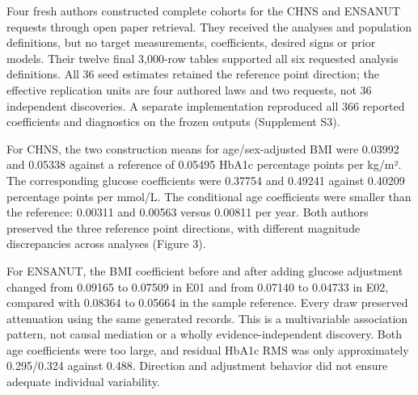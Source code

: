 \documentclass[11pt,letterpaper]{article}
\begin{document}
Four fresh authors constructed complete cohorts for the CHNS and ENSANUT requests through open paper retrieval. They received the analyses and population definitions, but no target measurements, coefficients, desired signs or prior models. Their twelve final 3,000-row tables supported all six requested analysis definitions. All 36 seed estimates retained the reference point direction; the effective replication units are four authored laws and two requests, not 36 independent discoveries. A separate implementation reproduced all 366 reported coefficients and diagnostics on the frozen outputs (Supplement S3).


For CHNS, the two construction means for age/\allowbreak{}sex-adjusted BMI were 0.03992 and 0.05338 against a reference of 0.05495 HbA1c percentage points per kg/\allowbreak{}m². The corresponding glucose coefficients were 0.37754 and 0.49241 against 0.40209 percentage points per mmol/\allowbreak{}L. The conditional age coefficients were smaller than the reference: 0.00311 and 0.00563 versus 0.00811 per year. Both authors preserved the three reference point directions, with different magnitude discrepancies across analyses (Figure 3).


For ENSANUT, the BMI coefficient before and after adding glucose adjustment changed from 0.09165 to 0.07509 in E01 and from 0.07140 to 0.04733 in E02, compared with 0.08364 to 0.05664 in the sample reference. Every draw preserved attenuation using the same generated records. This is a multivariable association pattern, not causal mediation or a wholly evidence-independent discovery. Both age coefficients were too large, and residual HbA1c RMS was only approximately 0.295/\allowbreak{}0.324 against 0.488. Direction and adjustment behavior did not ensure adequate individual variability.
\end{document}
